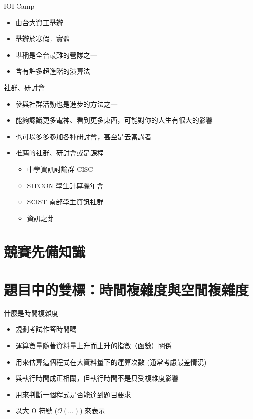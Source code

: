 \documentclass[aspectratio=169]{beamer}
\begin{document}
	\begin{frame}{IOI Camp}
		\begin{itemize}
			\item 由台大資工舉辦
			\item 舉辦於寒假，實體
			\item 堪稱是全台最難的營隊之一
			\item 含有許多超進階的演算法
		\end{itemize}
	\end{frame}

	\begin{frame}{社群、研討會}
		\begin{itemize}
			\item<1-> 參與社群活動也是進步的方法之一
			\item<2-> 能夠認識更多電神、看到更多東西，可能對你的人生有很大的影響
			\item<2-> 也可以多多參加各種研討會，甚至是去當講者
			\item<3-> 推薦的社群、研討會或是課程
				\begin{itemize}
					\item 中學資訊討論群 CISC
					\item SITCON 學生計算機年會
					\item SCIST 南部學生資訊社群
					\item 資訊之芽
				\end{itemize}
		\end{itemize}
	\end{frame}

	\section{競賽先備知識}

	\section{題目中的雙標：時間複雜度與空間複雜度}

	\begin{frame}{什麼是時間複雜度}
		\begin{itemize}
			\item<1-> \sout{規劃考試作答時間嗎}
			\item<2-> 運算數量隨著資料量上升而上升的指數（函數）關係
			\item<3-> 用來估算這個程式在大資料量下的運算次數 (通常考慮最差情況)
			\item<4-> 與執行時間成正相關，但執行時間不是只受複雜度影響
			\item<5-> 用來判斷一個程式是否能達到題目要求
			\item<6-> 以大 O 符號 ($\mathcal{O(...)}$) 來表示
		\end{itemize}
	\end{frame}
\end{document}
